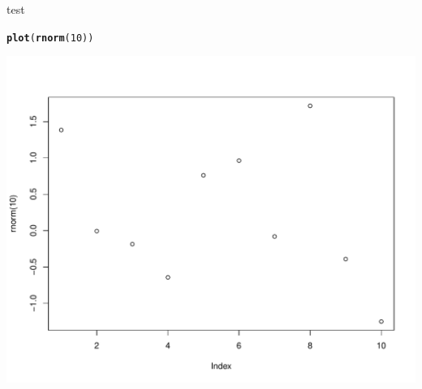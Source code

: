 \documentclass{beamer}\usepackage[]{graphicx}\usepackage[]{color}
\makeatletter
\newcommand{\hlnum}[1]{\textcolor[rgb]{0.686,0.059,0.569}{#1}}%
\newcommand{\hlstd}[1]{\textcolor[rgb]{0.345,0.345,0.345}{#1}}%
\newcommand{\hlkwd}[1]{\textcolor[rgb]{0.737,0.353,0.396}{\textbf{#1}}}%
\newenvironment{kframe}{%
 \def\at@end@of@kframe{}%
 \ifinner\ifhmode%
  \def\at@end@of@kframe{\end{minipage}}%
  \begin{minipage}{\columnwidth}%
 \fi\fi%
 \def\FrameCommand##1{\hskip\@totalleftmargin \hskip-\fboxsep
 \colorbox{shadecolor}{##1}\hskip-\fboxsep
     \hskip-\linewidth \hskip-\@totalleftmargin \hskip\columnwidth}%
 \MakeFramed {\advance\hsize-\width
   \@totalleftmargin\z@ \linewidth\hsize
   \@setminipage}}%
 {\par\unskip\endMakeFramed%
 \at@end@of@kframe}
\newenvironment{knitrout}{}{} %
\makeatother
\begin{document}
\begin{frame}[fragile]{test}
\begin{knitrout}\scriptsize
{}\color{fgcolor}\begin{kframe}
\begin{alltt}
\hlkwd{plot}\hlstd{(}\hlkwd{rnorm}\hlstd{(}\hlnum{10}\hlstd{))}
\end{alltt}
\end{kframe}

{\centering \includegraphics[width=1\linewidth]{figure/unnamed-chunk-1-1} 

}



\end{knitrout}
\end{frame}
\end{document}
